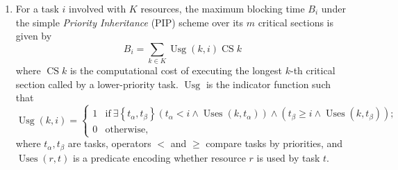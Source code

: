 \documentclass{article}
\numberwithin{equation}{section}
\numberwithin{table}{section}
\numberwithin{figure}{section}
\DeclareMathOperator\usage{Usg}
\DeclareMathOperator\cs{CS}
\DeclareMathOperator\uses{Uses}
\begin{document}
\begin{enumerate}
    \item For a task $i$ involved with $K$ resources, the maximum blocking time
        $B_i$ under the simple \emph{Priority Inheritance} (PIP) scheme over its
        $m$ critical sections is given by
        \begin{equation}
            B_i = \sum_{k\in K} \usage{(k,i)} \cs{k}
        \end{equation}
        where $\cs{k}$ is the computational cost of executing the longest $k$-th
        critical section called by a lower-priority task. $\usage$ is the
        indicator function such that
        \begin{equation}
            \usage{(k,i)} = \begin{cases}
                1 &\text{if}~%
                    \exists\left\{t_\alpha,t_\beta\right\}
                        \left(t_\alpha < i \land
                            \uses{\left(k,t_\alpha\right)}
                        \right) \land
                        \left(t_\beta \geq i \land
                            \uses{\left(k,t_\beta\right)}
                        \right)
                    \text{;} \\
                0 &\text{otherwise,}
            \end{cases}
        \end{equation}
        where $t_\alpha,t_\beta$ are tasks, operators $<$ and $\geq$ compare
        tasks by priorities, and $\uses{(r,t)}$ is a predicate encoding whether
        resource $r$ is used by task $t$.


\end{enumerate}
\end{document}
